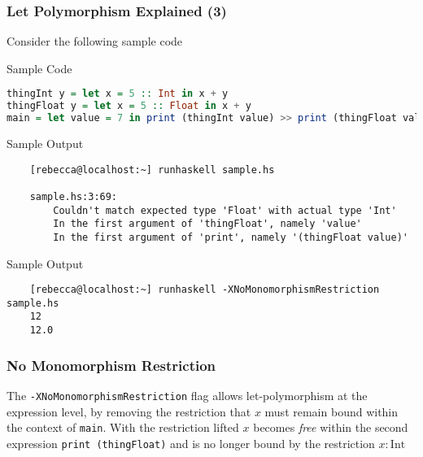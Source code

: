 \documentclass{beamer}
\begin{document}
\begin{frame}[fragile]
  \frametitle{Let Polymorphism Explained (3)}
  Consider the following sample code
  \begin{exampleblock}{Sample Code}
    \begin{lstlisting}[language=Haskell]
thingInt y = let x = 5 :: Int in x + y
thingFloat y = let x = 5 :: Float in x + y
main = let value = 7 in print (thingInt value) >> print (thingFloat value)
    \end{lstlisting}
  \end{exampleblock}

\begin{exampleblock}{Sample Output}
  \begin{tiny}
    \begin{verbatim}
    [rebecca@localhost:~] runhaskell sample.hs

    sample.hs:3:69:
        Couldn't match expected type 'Float' with actual type 'Int'
        In the first argument of 'thingFloat', namely 'value'
        In the first argument of 'print', namely '(thingFloat value)'
\end{verbatim}
\end{tiny}
  \end{exampleblock}

\begin{exampleblock}{Sample Output}
  \begin{tiny}
    \begin{verbatim}
    [rebecca@localhost:~] runhaskell -XNoMonomorphismRestriction sample.hs
    12
    12.0
\end{verbatim}
\end{tiny}
\end{exampleblock}
\end{frame}

\begin{frame}[fragile]
  \frametitle{No Monomorphism Restriction}
  The {\tt -XNoMonomorphismRestriction} flag allows let-polymorphism
  at the expression level, by removing the restriction that $x$ must
  remain bound within the context of {\tt main}.  With the restriction
  lifted $x$ becomes \emph{free} within the second expression
  {\tt print (thingFloat)} and is no longer bound by the restriction
  $x : \text{Int}$
\end{frame}
\end{document}

